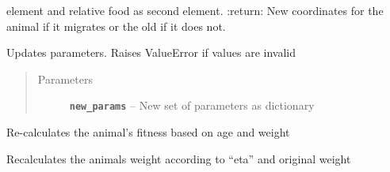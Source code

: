 \documentclass[a4paper,10pt,openany,oneside]{sphinxmanual}
\begin{document}
\begin{fulllineitems}
\begin{fulllineitems}
element and relative food as second element.
:return: New coordinates for the animal if it migrates or the old
if it does not.

\end{fulllineitems}


\begin{fulllineitems}
\label{animals:biosim.animals.Animal.set_parameters}
Updates parameters. Raises ValueError if values are invalid
\begin{quote}\begin{description}
\item[{Parameters}] \leavevmode
\textbf{\texttt{new\_params}} -- New set of parameters as dictionary

\end{description}\end{quote}

\end{fulllineitems}


\begin{fulllineitems}
\label{animals:biosim.animals.Animal.update_fitness}
Re-calculates the animal's fitness based on age and weight

\end{fulllineitems}


\begin{fulllineitems}
\label{animals:biosim.animals.Animal.weightloss}
Recalculates the animals weight according to ``eta'' and original weight

\end{fulllineitems}


\end{fulllineitems}

\end{document}
